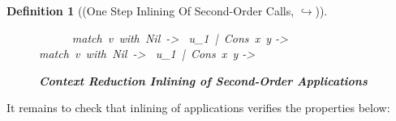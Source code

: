\documentclass[a4paper,11pt,oneside]{article}
\theoremstyle{plain}
\newtheorem{definition}{Definition}[subsection]
\newcommand{\icarr}{\hookrightarrow}
\begin{document}
\begin{definition}[(One Step Inlining Of Second-Order Calls, $\icarr$)]
\begin{figure}[H]
\begin{footnotesize}
\begin{adjustwidth}{-8em}{-3em}
\begin{multicols}{2}
	\infrule[$I_2$-Match$_2$]
		{ \boldsymbol{s_2 \icarr s_2'} \quad u_1 \in U}
			{~~~~~ match~v~with~Nil~->~ u_1~|~Cons~x~y ->  \icarr \\ 
				match~v~with~Nil~->~ u_1~|~Cons~x~y -> }					
		
	\end{multicols}
	\end{adjustwidth}
	\caption{ \textbf{Context Reduction Inlining of Second-Order Applications}\hfill}
 	\label{fig:inl-app-c-d}
 		\end{footnotesize}
	\end{figure}
\end{definition}
%

It remains to check that inlining of applications verifies the properties below:
\end{document}

